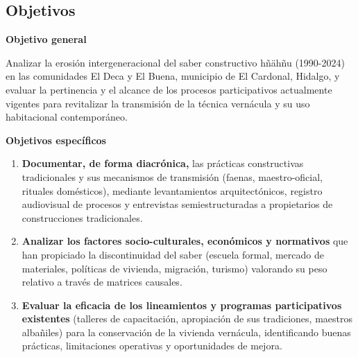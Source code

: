 \subsection{Objetivos}

\textbf{Objetivo general}

Analizar la erosión intergeneracional del saber constructivo hñähñu (1990-2024) en las comunidades El Deca y El Buena, municipio de El Cardonal, Hidalgo, y evaluar la pertinencia y el alcance de los procesos participativos actualmente vigentes para revitalizar la transmisión de la técnica vernácula y su uso habitacional contemporáneo.

\vspace{1em}
\textbf{Objetivos específicos}

\begin{enumerate}
  \item \textbf{Documentar, de forma diacrónica,} las prácticas constructivas tradicionales y sus mecanismos de transmisión (faenas, maestro-oficial, rituales domésticos), mediante levantamientos arquitectónicos, registro audiovisual de procesos y entrevistas semiestructuradas a propietarios de construcciones tradicionales.

  \item \textbf{Analizar los factores socio-culturales, económicos y normativos} que han propiciado la discontinuidad del saber (escuela formal, mercado de materiales, políticas de vivienda, migración, turismo) valorando su peso relativo a través de matrices causales.

  \item \textbf{Evaluar la eficacia de los lineamientos y programas participativos existentes} (talleres de capacitación, apropiación de sus tradiciones, maestros albañiles) para la conservación de la vivienda vernácula, identificando buenas prácticas, limitaciones operativas y oportunidades de mejora.
\end{enumerate}
